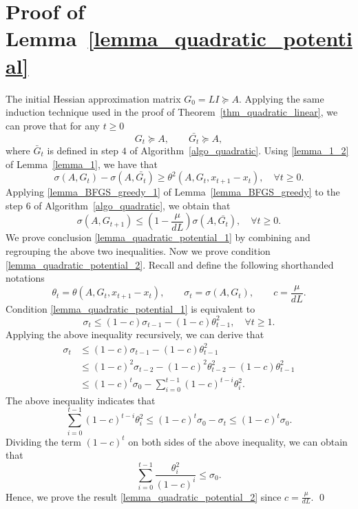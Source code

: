 \documentclass[11pt]{article}
\numberwithin{assumption}{section}
\numberwithin{remark}{section}
\numberwithin{theorem}{section}
\begin{document}
\section{Proof of Lemma~\ref{lemma_quadratic_potential}}\label{sec:proof_of_lemma_quadratic_potential}

The initial Hessian approximation matrix $G_0 = LI \succeq A$. Applying the same induction technique used in the proof of Theorem~\ref{thm_quadratic_linear}, we can prove that for any $t \geq 0$
\begin{equation}
G_t \succeq A, \qquad  \bar{G_t} \succeq A,
\end{equation}
where $\bar{G}_t$ is defined in step $4$ of Algorithm~\ref{algo_quadratic}. Using \eqref{lemma_1_2} of Lemma~\ref{lemma_1}, we have that
\begin{equation}
    \sigma(A, G_t) - \sigma(A, \bar{G_t}) \geq \theta^2(A, G_t , x_{t + 1} - x_t), \quad \forall t \geq 0.
\end{equation}
Applying \eqref{lemma_BFGS_greedy_1} of Lemma~\ref{lemma_BFGS_greedy} to the step $6$ of Algorithm~\ref{algo_quadratic}, we obtain that
\begin{equation}
    \sigma(A, G_{t + 1}) \leq (1 - \frac{\mu}{dL})\sigma(A, \bar{G_t}), \quad \forall t \geq 0.
\end{equation}
We prove conclusion \eqref{lemma_quadratic_potential_1} by combining and regrouping the above two inequalities. Now we prove condition \eqref{lemma_quadratic_potential_2}. Recall and define the following shorthanded notations
\begin{equation}
\theta_t = \theta(A, G_t, x_{t + 1} - x_{t}), \qquad \sigma_t = \sigma(A, G_t), \qquad c = \frac{\mu}{dL}.
\end{equation}
Condition \eqref{lemma_quadratic_potential_1} is equivalent to
\begin{equation}
    \sigma_{t} \leq (1 - c)\sigma_{t - 1} - (1 - c)\theta^2_{t - 1}, \quad \forall t \geq 1.
\end{equation}
Applying the above inequality recursively, we can derive that
\begin{equation}
\begin{split}
    \sigma_{t} & \leq (1 - c)\sigma_{t - 1} - (1 - c)\theta^2_{t - 1}\\
    & \leq (1 - c)^2\sigma_{t - 2} - (1 - c)^2\theta^2_{t - 2} - (1 - c)\theta^2_{t - 1}\\
    & \leq (1 - c)^t\sigma_{0} - \sum_{i = 0}^{t - 1}(1 - c)^{t - i}\theta^2_i.
\end{split}
\end{equation}
The above inequality indicates that
\begin{equation}\label{proof_lemma_quadratic_potential_1}
\sum_{i = 0}^{t - 1}(1 - c)^{t - i}\theta^2_i \leq (1 - c)^t\sigma_{0} - \sigma_{t} \leq (1 - c)^t\sigma_{0}.
\end{equation}
Dividing the term $(1 - c)^t$ on both sides of the above inequality, we can obtain that
\begin{equation}
\sum_{i = 0}^{t - 1}\frac{\theta^2_i}{(1 - c)^i} \leq \sigma_{0}.
\end{equation}
Hence, we prove the result \eqref{lemma_quadratic_potential_2} since $c = \frac{\mu}{dL}$. \hfill \qed
\end{document}

